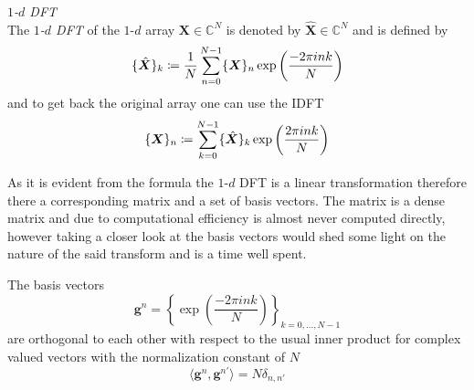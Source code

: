 \begin{Def}\label{def:1ddft}
    \emph{$1$-$d$ \ac{DFT}}\\
    The \emph{$1$-$d$ \ac{DFT}} of the $1$-$d$ array $\boldsymbol{X} \in \mathbb{C}^{N}$ is denoted by 
    $\hat {\boldsymbol{X}} \in \mathbb{C}^{N}$ and is defined by
    \begin{equation}\label{eq:1ddft}
        \{\hat {\boldsymbol{X}}\}_{k} \coloneqq \frac{1}{N}\sum_{n=0}^{N-1} \{{\boldsymbol{X}}\}_{n}\exp\left({\frac{-2\pi ink}{N}}\right)\index{\ac{FT}!$1$-$d$ \ac{DFT}}
    \end{equation}
    and to get back the original array one can use the \ac{IDFT} 
    \begin{equation}\label{eq:1didft}
        \{{\boldsymbol{X}}\}_{n} \coloneqq \sum_{k=0}^{N-1}\{\hat {\boldsymbol{X}}\}_{k}\exp\left({\frac{2\pi ink}{N}}\right)\index{\ac{FT}!$1$-$d$ \ac{IDFT}}
    \end{equation}    
\end{Def}

As it is evident from the formula the $1$-$d$ \ac{DFT} is a linear transformation therefore there a corresponding matrix 
and a set of basis vectors. The matrix is a dense matrix\cite{Frazier1999}\cite{Cormen2022} and due to computational 
efficiency\cite{Frazier1999}\cite{Cormen2022} is almost never computed directly, however taking a closer look at the 
basis vectors would shed some light on the nature of the said transform and is a time well spent.

\begin{Prop}\label{Prop:1ddftbasisvectors}
    The basis vectors
    \begin{equation}\label{eq:1ddftbasisvectors}
        \boldsymbol{g}^n = \left\{\exp\left({\frac{-2\pi ink}{N}}\right)\right\}_{k=0,\ldots,N-1}
    \end{equation}
    are orthogonal to each other with respect to the usual inner product for complex valued vectors 
    with the normalization constant of $N$
    \begin{equation}
        \langle\boldsymbol{g}^n,\boldsymbol{g}^{n'}\rangle= N \delta_{n,n'}
    \end{equation}
\end{Prop}

